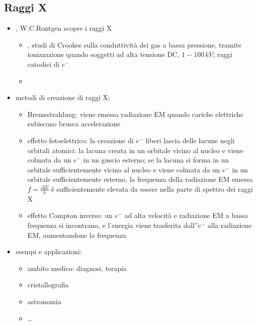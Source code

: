 \documentclass[letterpaper,10pt,italian]{jupyterBook}
\begin{document}
\subsection{Raggi X}
\label{\detokenize{ch/modern/intro-radioactivity:raggi-x}}\begin{itemize}
\item {} 
, W.C.Rontgen scopre i raggi X
\begin{itemize}
\item {} 
, studi di Crookes sulla conduttività dei gas a bassa pressione, tramite ionizzazione quando soggetti ad alta tensione DC, \(1-100 \, kV\); raggi catodici di \(e^-\)

\item {} 
\end{itemize}

\item {} 
\sphinxAtStartPar
metodi di creazione di raggi X:
\begin{itemize}
\item {} 
\sphinxAtStartPar
Bremsstrahlung: viene emessa radiazione EM quando cariche elettriche subiscono brusca accelerazione

\item {} 
\sphinxAtStartPar
effetto fotoelettrico: la creazione di \(e^-\) liberi lascia delle lacune negli orbitali atomici: la lacuna creata in un orbitale vicino al nucleo e viene colmata da un \(e^-\) in un guscio esterno; se la lacuna si forma in un orbitale sufficientemente vicino al nucleo e viene colmata da un \(e^-\) in un orbitale sufficientemente esterno, la frequenza della radiazione EM emessa \(f = \frac{\Delta E}{h}\) è sufficientemente elevata da essere nella parte di spettro dei raggi X

\item {} 
\sphinxAtStartPar
effetto Compton inverso: un \(e^-\) ad alta velocità e radiazione EM a bassa frequenza si incontrano, e l’energia viene trasferita dall”\(e^-\) alla radiazione EM, aumentandone la frequenza

\end{itemize}

\item {} 
\sphinxAtStartPar
esempi e applicazioni:
\begin{itemize}
\item {} 
\sphinxAtStartPar
ambito medico: diagnosi, terapia

\item {} 
\sphinxAtStartPar
cristallografia

\item {} 
\sphinxAtStartPar
astronomia

\item {} 
\sphinxAtStartPar
…

\end{itemize}

\end{itemize}
\end{document}
